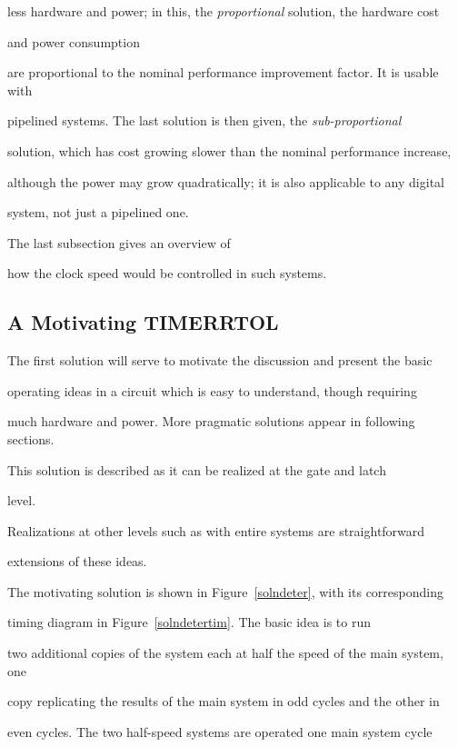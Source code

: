 \documentclass[12pt,dvips]{article}
\begin{document}
less hardware and power; in this, the {\it proportional} solution, the hardware cost

and power consumption

are proportional to the nominal performance improvement factor. It is usable with

pipelined systems. The last solution is then given, the {\it sub-proportional}

solution, which has cost growing slower than the nominal performance increase,

although the power may grow quadratically; it is also applicable to any digital

system, not just a pipelined one.

The last subsection gives an overview of

how the clock speed would be controlled in such systems. 





\subsection{A Motivating TIMERRTOL}

The first solution will serve to motivate the discussion and present the basic

operating ideas in a circuit which is easy to understand, though requiring

much hardware and power. More pragmatic solutions appear in following sections.



This solution is described as it can be realized at the gate and latch

level.

Realizations at other levels such as with entire systems are straightforward

extensions of these ideas.



The motivating solution is shown in Figure~\ref{solndeter}, with its corresponding

timing diagram in Figure~\ref{solndetertim}. The basic idea is to run

two additional copies of the system each at half the speed of the main system, one

copy replicating the results of the main system in odd cycles and the other in

even cycles. The two half-speed systems are operated one main system cycle
\end{document}

